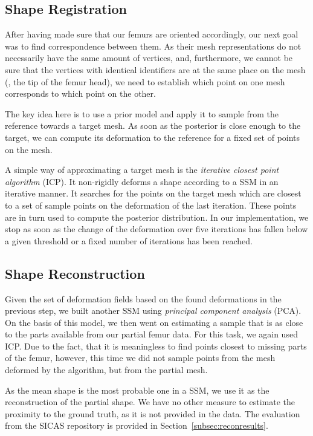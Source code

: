 
\subsection{Shape Registration}
\label{subsec:registr}

After having made sure that our femurs are oriented accordingly, our next goal was to find correspondence between them.
As their mesh representations do not necessarily have the same amount of vertices, and, furthermore, we cannot be sure that the vertices with identical identifiers are at the same place on the mesh (\eg, the tip of the femur head), we need to establish which point on one mesh corresponds to which point on the other.

The key idea here is to use a prior model and apply it to sample from the reference towards a target mesh.
As soon as the posterior is close enough to the target, we can compute its deformation to the reference for a fixed set of points on the mesh.

A simple way of approximating a target mesh is the \emph{iterative closest point algorithm} (ICP).
It non-rigidly deforms a shape according to a SSM in an iterative manner.
It searches for the points on the target mesh which are closest to a set of sample points on the deformation of the last iteration.
These points are in turn used to compute the posterior distribution.
In our implementation, we stop as soon as the change of the deformation over five iterations has fallen below a given threshold or a fixed number of iterations has been reached.


\subsection{Shape Reconstruction}
\label{subsec:recon}

Given the set of deformation fields based on the found deformations in the previous step, we built another SSM using \emph{principal component analysis} (PCA).
On the basis of this model, we then went on estimating a sample that is as close to the parts available from our partial femur data.
For this task, we again used ICP.
Due to the fact, that it is meaningless to find points closest to missing parts of the femur, however, this time we did not sample points from the mesh deformed by the algorithm, but from the partial mesh.

As the mean shape is the most probable one in a SSM, we use it as the reconstruction of the partial shape.
We have no other measure to estimate the proximity to the ground truth, as it is not provided in the data.
The evaluation from the SICAS repository is provided in Section~\ref{subsec:reconresults}.
